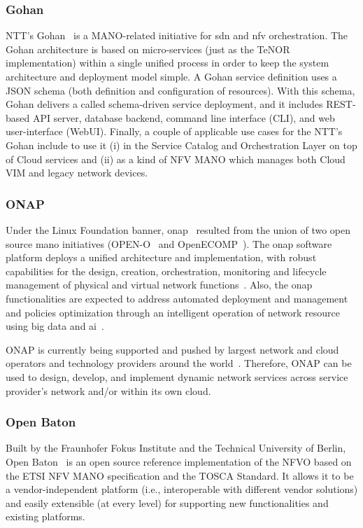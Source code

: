 \subsubsection{Gohan}
NTT's Gohan~\cite{gohan} is a MANO-related initiative for \gls{sdn} and \gls{nfv} orchestration. The Gohan architecture is based on micro-services (just as the TeNOR implementation) within a single unified process in order to keep the system architecture and deployment model simple. A Gohan service definition uses a JSON schema (both definition and configuration of resources). With this schema, Gohan delivers a called schema-driven service deployment, and it includes REST-based API server, database backend, command line interface (CLI), and web user-interface (WebUI). Finally, a couple of applicable use cases for the NTT's Gohan include to use it (i) in the Service Catalog and Orchestration Layer on top of Cloud services and (ii) as a kind of NFV MANO which manages both Cloud VIM and legacy network devices. 

\subsubsection{ONAP}
Under the Linux Foundation banner, \acrfull{onap}~\cite{onap} resulted from the union of two open source \gls{mano} initiatives (OPEN-O~\cite{Foundation} and OpenECOMP~\cite{ATT2016ECOMPPaper}). The \gls{onap} software platform deploys a unified architecture and implementation, with robust capabilities for the design, creation, orchestration, monitoring and lifecycle management of physical and virtual network functions~\cite{onapwiki}. Also, the \gls{onap} functionalities are expected to address automated deployment and management and policies optimization through an intelligent operation of network resource using big data and \gls{ai}~\cite{onapconvergedigest}.

ONAP is currently being supported and pushed by largest network and cloud operators and technology providers around the world~\cite{onapGuide}. Therefore, ONAP can be used to design, develop, and implement dynamic network services across service provider's network and/or within its own cloud.

\subsubsection{Open Baton}
Built by the Fraunhofer Fokus Institute and the Technical University of Berlin, Open Baton~\cite{openbatongit} is an open source reference implementation of the NFVO based on the ETSI NFV MANO specification and the TOSCA Standard. It allows it to be a vendor-independent platform (i.e., interoperable with different vendor solutions) and easily extensible (at every level) for supporting new functionalities and existing platforms.

